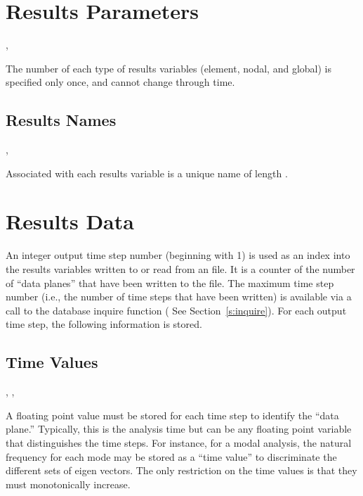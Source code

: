 \section{Results Parameters}

\api{}, 


The number of each type of results variables (element, nodal,
and global) is specified only once, and cannot change through
time.

\subsection{Results Names}

\begin{spacing}{1.5}
\api {}, 
\end{spacing}

Associated with each results variable is a unique name of
length .



\section{Results Data}


An integer output time step number (beginning with 1) is used as an
index into the results variables written to or read from an \exo{}
file. It is a counter of the number of ``data planes'' that have been
written to the file. The maximum time step number (i.e., the number of
time steps that have been written) is available via a call to the
database inquire function ( See Section~\ref{s:inquire}). For each
output time step, the following information is stored.

\subsection{Time Values}

\begin{spacing}{1.5}
\api {}, , 
\end{spacing}

A floating point value must be stored for each time step to identify
the ``data plane.'' Typically, this is the analysis time but can be
any floating point variable that distinguishes the time steps. For
instance, for a modal analysis, the natural frequency for each mode
may be stored as a ``time value'' to discriminate the different sets
of eigen vectors. The only restriction on the time values is that they
must monotonically increase.

